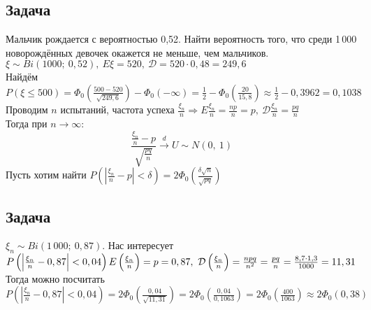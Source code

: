 \documentclass[12pt, a4paper]{article}
\begin{document}
    \subsection*{Задача}
    Мальчик рождается с вероятностью 0,52. Найти вероятность того, что среди 1\,000 новорождённых девочек окажется не меньше, чем мальчиков.\\
    $\xi \sim Bi(1000;\ 0,52),\ E\xi = 520,\ \mathcal{D} = 520\cdot 0,48 = 249,6$\\
    Найдём $P(\xi \leq 500) = \Phi_0\left( \frac{500 - 520}{\sqrt{249,6}} \right) - \Phi_0(-\infty) = \frac{1}{2} - \Phi_0\left( \frac{20}{15,8} \right) \approx \frac{1}{2} - 0,3962 = 0,1038$\\
    Проводим $n$ испытаний, частота успеха $\frac{\xi_n}{n}\Rightarrow E\frac{\xi_n}{n} = \frac{np}{n} = p,\ \mathcal{D}\frac{\xi_n}{n} = \frac{pq}{n}$\\
    Тогда при $n\to\infty$:
    \[\frac{\frac{\xi_n}{n} - p}{\sqrt{\frac{pq}{n}}}\xrightarrow{d} U \sim N(0,\ 1)\]
    Пусть хотим найти $P\left( \left| \frac{\xi_n}{n} - p \right| < \delta\right) = 2\Phi_0\left( \frac{\delta\sqrt{n}}{\sqrt{pq}} \right)$
    \subsection*{Задача}
    $\xi_n \sim Bi(1\,000;\ 0,87)$. Нас интересует $P \left( \left| \frac{\xi_n}{n} - 0,87 \right| < 0,04 \right)\\
    E\left( \frac{\xi_n}{n} \right) = p = 0,87,\ \mathcal{D}\left( \frac{\xi_n}{n} \right) = \frac{npq}{n^2} = \frac{pq}{n} = \frac{8,7\cdot 1,3}{1000} = 11,31$\\
    Тогда можно посчитать $P \left( \left| \frac{\xi_n}{n} - 0,87 \right| < 0,04 \right) = 2\Phi_0\left( \frac{0,04}{\sqrt{11,31}} \right) = 2\Phi_0\left( \frac{0,04}{0,1063} \right) = 2\Phi_0\left( \frac{400}{1063} \right) \approx 2\Phi_0(0,38)$
\end{document}
